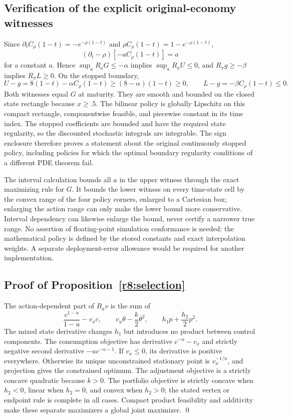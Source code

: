 \subsection{Verification of the explicit original-economy witnesses}
Since $\partial_tC_\rho(1-t)=-e^{-\rho(1-t)}$ and $\rho C_\rho(1-t)=1-e^{-\rho(1-t)}$,
\[
 (\partial_t-\rho)[-aC_\rho(1-t)]=a
\]
for a constant $a$. Hence $\sup_aR_aG\leq-\alpha$ implies $\sup_aR_aU\leq0$, and $R_\pi g\geq-\beta$ implies $R_\pi L\geq0$. On the stopped boundary,
\[
 U-g=8(1-t)-\alpha C_\rho(1-t)\geq(8-\alpha)(1-t)\geq0,
 \qquad L-g=-\beta C_\rho(1-t)\leq0.
\]
Both witnesses equal $G$ at maturity. They are smooth and bounded on the closed state rectangle because $x\geq.5$. The bilinear policy is globally Lipschitz on this compact rectangle, componentwise feasible, and piecewise constant in its time index. The stopped coefficients are bounded and have the required state regularity, so the discounted stochastic integrals are integrable. The sign enclosure therefore proves a statement about the original continuously stopped policy, including policies for which the optimal boundary regularity conditions of a different PDE theorem fail.

The interval calculation bounds all $a$ in the upper witness through the exact maximizing rule for $G$. It bounds the lower witness on every time-state cell by the convex range of the four policy corners, enlarged to a Cartesian box; enlarging the action range can only make the lower bound more conservative. Interval dependency can likewise enlarge the bound, never certify a narrower true range. No assertion of floating-point simulation conformance is needed: the mathematical policy is defined by the stored constants and exact interpolation weights. A separate deployment-error allowance would be required for another implementation.

\subsection{Proof of Proposition~\ref{r8:selection}}
The action-dependent part of $R_av$ is the sum of
\[
 \frac{c^{1-u}}{1-u}-v_xc,\qquad v_u\theta-\frac{k}{2}\theta^2,
 \qquad h_1p+\frac{h_2}{2}p^2.
\]
The mixed state derivative changes $h_1$ but introduces no product between control components. The consumption objective has derivative $c^{-u}-v_x$ and strictly negative second derivative $-uc^{-u-1}$. If $v_x\leq0$, its derivative is positive everywhere. Otherwise its unique unconstrained stationary point is $v_x^{-1/u}$, and projection gives the constrained optimum. The adjustment objective is a strictly concave quadratic because $k>0$. The portfolio objective is strictly concave when $h_2<0$, linear when $h_2=0$, and convex when $h_2>0$; the stated vertex or endpoint rule is complete in all cases. Compact product feasibility and additivity make these separate maximizers a global joint maximizer. \qed

